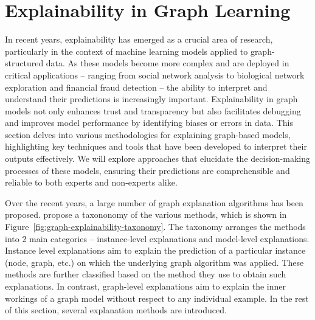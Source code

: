 
\section{Explainability in Graph Learning}

In recent years, explainability has emerged as a crucial area of research, particularly in the context of machine learning models applied to graph-structured data. As these models become more complex and are deployed in critical applications -- ranging from social network analysis to biological network exploration and financial fraud detection -- the ability to interpret and understand their predictions is increasingly important. Explainability in graph models not only enhances trust and transparency but also facilitates debugging and improves model performance by identifying biases or errors in data. This section delves into various methodologies for explaining graph-based models, highlighting key techniques and tools that have been developed to interpret their outputs effectively. We will explore approaches that elucidate the decision-making processes of these models, ensuring their predictions are comprehensible and reliable to both experts and non-experts alike.

Over the recent years, a large number of graph explanation algorithms has been proposed. \cite{yuan_explainability_2022} propose a taxononomy of the various methods, which is shown in Figure~\ref{fig:graph-explainability-taxonomy}. The taxonomy arranges the methods into 2 main categories -- instance-level explanations and model-level explanations. Instance level explanations aim to explain the prediction of a particular instance (node, graph, etc.) on which the underlying graph algorithm was applied. These methods are further classified based on the method they use to obtain such explanations. In contrast, graph-level explanations aim to explain the inner workings of a graph model without respect to any individual example. In the rest of this section, several explanation methods are introduced.

